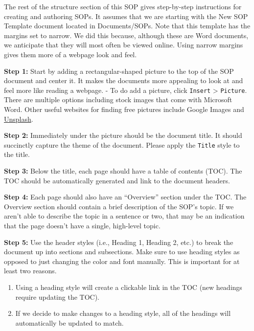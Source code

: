 \documentclass[
  letterpaper,
  DIV=11,
  numbers=noendperiod]{scrreprt}
\providecommand{\tightlist}{%
  \setlength{\itemsep}{0pt}\setlength{\parskip}{0pt}}\usepackage{longtable,booktabs,array}
\begin{document}
The rest of the structure section of this SOP gives step-by-step
instructions for creating and authoring SOPs. It assumes that we are
starting with the New SOP Template document located in Documents/SOPs.
Note that this template has the margins set to narrow. We did this
because, although these are Word documents, we anticipate that they will
most often be viewed online. Using narrow margins gives them more of a
webpage look and feel.

\textbf{Step 1:} Start by adding a rectangular-shaped picture to the top
of the SOP document and center it. It makes the documents more appealing
to look at and feel more like reading a webpage. - To do add a picture,
click \texttt{Insert} \textgreater{} \texttt{Picture}. There are
multiple options including stock images that come with Microsoft Word.
Other useful websites for finding free pictures include Google Images
and \href{https://unsplash.com/}{Unsplash}.

\textbf{Step 2:} Immediately under the picture should be the document
title. It should succinctly capture the theme of the document. Please
apply the \texttt{Title} style to the title.

\textbf{Step 3:} Below the title, each page should have a table of
contents (TOC). The TOC should be automatically generated and link to
the document headers.

\textbf{Step 4:} Each page should also have an ``Overview'' section
under the TOC. The Overview section should contain a brief description
of the SOP's topic. If we aren't able to describe the topic in a
sentence or two, that may be an indication that the page doesn't have a
single, high-level topic.

\textbf{Step 5:} Use the header styles (i.e., Heading 1, Heading 2,
etc.) to break the document up into sections and subsections. Make sure
to use heading styles as opposed to just changing the color and font
manually. This is important for at least two reasons.

\begin{enumerate}
\def\labelenumi{\arabic{enumi}.}
\tightlist
\item
  Using a heading style will create a clickable link in the TOC (new
  headings require updating the TOC).\\
\item
  If we decide to make changes to a heading style, all of the headings
  will automatically be updated to match.
\end{enumerate}
\end{document}
